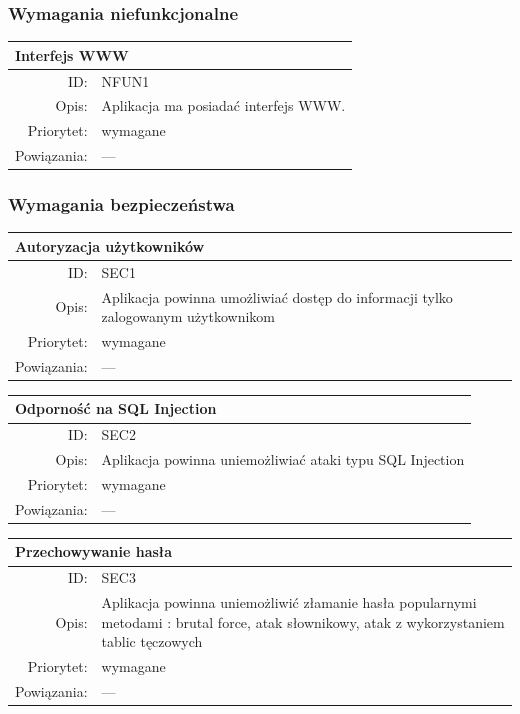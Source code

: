 \subsubsection{Wymagania niefunkcjonalne}
 \begin{center}
    \begin{tabular}{rp{10cm}}
      \multicolumn{2}{l}{\textbf{Interfejs WWW}} \\
      \hline
      ID: & NFUN1 \\
      Opis: & Aplikacja ma posiadać interfejs WWW. \\
      Priorytet: & wymagane \\
      Powiązania: & --- \\
    \end{tabular}
    \end{center}

\subsubsection{Wymagania bezpieczeństwa}
\begin{center}
      \begin{tabular}{rp{10cm}}
	      \multicolumn{2}{l}{\textbf{Autoryzacja użytkowników}} \\
	      \hline
	      ID: & SEC1 \\
	      Opis: & Aplikacja powinna umożliwiać dostęp do informacji tylko zalogowanym użytkownikom \\
	      Priorytet: & wymagane \\
	      Powiązania: & --- \\
    \end{tabular}
\end{center}

\begin{center}
      \begin{tabular}{rp{10cm}}
	      \multicolumn{2}{l}{\textbf{Odporność na SQL Injection}} \\
	      \hline
	      ID: & SEC2 \\
	      Opis: & Aplikacja powinna uniemożliwiać ataki typu SQL Injection \\
	      Priorytet: & wymagane \\
	      Powiązania: & --- \\
    \end{tabular}
\end{center}

\begin{center}
      \begin{tabular}{rp{10cm}}
	      \multicolumn{2}{l}{\textbf{Przechowywanie hasła}} \\
	      \hline
	      ID: & SEC3 \\
	      Opis: & Aplikacja powinna uniemożliwić złamanie hasła popularnymi metodami : brutal force, atak słownikowy, atak z wykorzystaniem tablic tęczowych \\
	      Priorytet: & wymagane \\
	      Powiązania: & --- \\
    \end{tabular}
\end{center}

